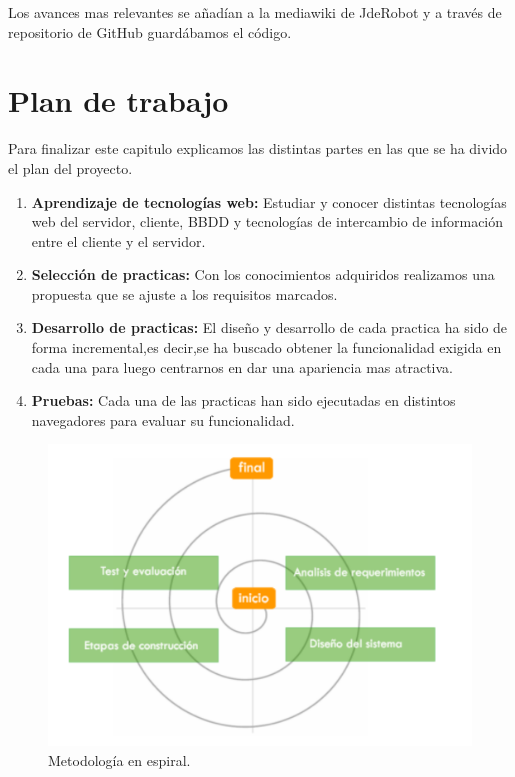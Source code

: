 Los avances mas relevantes se añadían a la mediawiki \cite{Mediawiki} de JdeRobot y a través de repositorio de GitHub \cite{Repositorio} guardábamos el código.
\section{Plan de trabajo}
Para finalizar este capitulo explicamos las distintas partes en las que se ha divido el plan del proyecto.
\begin{enumerate}
\item \textbf{Aprendizaje de tecnologías web:} Estudiar y conocer distintas tecnologías web del servidor, cliente, BBDD y tecnologías de intercambio de información entre el cliente y el servidor.
\item \textbf{Selección de practicas:} Con los conocimientos adquiridos realizamos una propuesta que se ajuste a los requisitos marcados.
\item \textbf{Desarrollo de practicas:} El diseño y desarrollo de cada practica ha sido de forma incremental,es decir,se ha buscado obtener la funcionalidad exigida en cada una para luego centrarnos en dar una apariencia mas atractiva.
\item \textbf{Pruebas:} Cada una de las practicas han sido ejecutadas en distintos navegadores para evaluar su funcionalidad.
\end{enumerate}
\begin{figure}[!h]
\centering
\includegraphics[width=0.8\linewidth]{Figures/espiral}
\decoRule
\caption[Metodología en espiral]{Metodología en espiral.}
\label{fig:espiral}
\end{figure}
